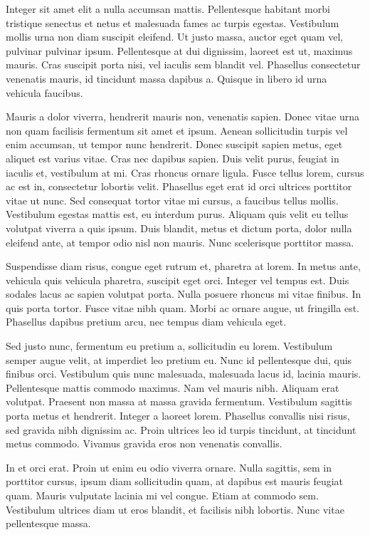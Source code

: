 Integer sit amet elit a nulla accumsan mattis. Pellentesque habitant morbi tristique senectus et netus et malesuada fames ac turpis egestas. Vestibulum mollis urna non diam suscipit eleifend. Ut justo massa, auctor eget quam vel, pulvinar pulvinar ipsum. Pellentesque at dui dignissim, laoreet est ut, maximus mauris. Cras suscipit porta nisi, vel iaculis sem blandit vel. Phasellus consectetur venenatis mauris, id tincidunt massa dapibus a. Quisque in libero id urna vehicula faucibus.

Mauris a dolor viverra, hendrerit mauris non, venenatis sapien. Donec vitae urna non quam facilisis fermentum sit amet et ipsum. Aenean sollicitudin turpis vel enim accumsan, ut tempor nunc hendrerit. Donec suscipit sapien metus, eget aliquet est varius vitae. Cras nec dapibus sapien. Duis velit purus, feugiat in iaculis et, vestibulum at mi. Cras rhoncus ornare ligula. Fusce tellus lorem, cursus ac est in, consectetur lobortis velit. Phasellus eget erat id orci ultrices porttitor vitae ut nunc. Sed consequat tortor vitae mi cursus, a faucibus tellus mollis. Vestibulum egestas mattis est, eu interdum purus. Aliquam quis velit eu tellus volutpat viverra a quis ipsum. Duis blandit, metus et dictum porta, dolor nulla eleifend ante, at tempor odio nisl non mauris. Nunc scelerisque porttitor massa.

Suspendisse diam risus, congue eget rutrum et, pharetra at lorem. In metus ante, vehicula quis vehicula pharetra, suscipit eget orci. Integer vel tempus est. Duis sodales lacus ac sapien volutpat porta. Nulla posuere rhoncus mi vitae finibus. In quis porta tortor. Fusce vitae nibh quam. Morbi ac ornare augue, ut fringilla est. Phasellus dapibus pretium arcu, nec tempus diam vehicula eget.

Sed justo nunc, fermentum eu pretium a, sollicitudin eu lorem. Vestibulum semper augue velit, at imperdiet leo pretium eu. Nunc id pellentesque dui, quis finibus orci. Vestibulum quis nunc malesuada, malesuada lacus id, lacinia mauris. Pellentesque mattis commodo maximus. Nam vel mauris nibh. Aliquam erat volutpat. Praesent non massa at massa gravida fermentum. Vestibulum sagittis porta metus et hendrerit. Integer a laoreet lorem. Phasellus convallis nisi risus, sed gravida nibh dignissim ac. Proin ultrices leo id turpis tincidunt, at tincidunt metus commodo. Vivamus gravida eros non venenatis convallis.

In et orci erat. Proin ut enim eu odio viverra ornare. Nulla sagittis, sem in porttitor cursus, ipsum diam sollicitudin quam, at dapibus est mauris feugiat quam. Mauris vulputate lacinia mi vel congue. Etiam at commodo sem. Vestibulum ultrices diam ut eros blandit, et facilisis nibh lobortis. Nunc vitae pellentesque massa.

